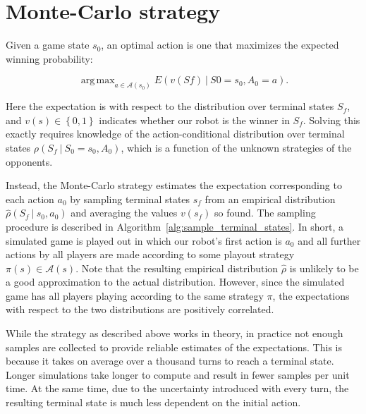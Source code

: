 \documentclass{article}
\newcommand{\Action}{A}
\newcommand{\action}{a}
\newcommand{\actions}{\mathcal{A}}
\newcommand{\randomState}{S}
\newcommand{\state}{s}
\newcommand{\evaluator}{v}
\newcommand{\probability}{\rho}
\newcommand{\expectation}[2]{E\left({#1\given#2}\right)}
\newcommand{\given}[1][]{\:#1\vert\:}
\DeclareMathOperator*{\argmax}{arg\,max}
\newcommand{\initial}{0}
\newcommand{\final}{f}
\begin{document}
\section{Monte-Carlo strategy}

Given a game state $\state_\initial$, an optimal action is one that maximizes the expected winning probability:

\[
\argmax_{\action \in \actions\left(\state_\initial\right)} \expectation{\evaluator\left(\randomState\final\right)}{\randomState\initial=\state_\initial, \Action_\initial=\action}.
\]

Here the expectation is with respect to the distribution over terminal states $\randomState_\final$, and $\evaluator\left(\state\right) \in \left\{0,1\right\}$ indicates whether our robot is the winner in $\randomState_\final$.  Solving this exactly requires knowledge of the action-conditional distribution over terminal states $\probability\left(\randomState_\final \given \randomState_\initial=\state_\initial, \Action_\initial\right)$, which is a function of the unknown strategies of the opponents.

Instead, the Monte-Carlo strategy estimates the expectation corresponding to each action $\action_\initial$ by sampling terminal states $\state_\final$ from an empirical distribution $\hat{\probability}\left(\randomState_\final \given \state_\initial,\action_\initial\right)$ and averaging the values $\evaluator\left(\state_\final\right)$ so found.  The sampling procedure is described in Algorithm~\ref{alg:sample_terminal_states}.  In short, a simulated game is played out in which our robot's first action is $\action_\initial$ and all further actions by all players are made according to some playout strategy $\pi\left(\state\right) \in \actions\left(\state\right)$.  Note that the resulting empirical distribution $\hat{\probability}$ is unlikely to be a good approximation to the actual distribution.  However, since the simulated game has all players playing according to the same strategy $\pi$, the expectations with respect to the two distributions are positively correlated.

While the strategy as described above works in theory, in practice not enough samples are collected to provide reliable estimates of the expectations.  This is because it takes on average over a thousand turns to reach a terminal state.  Longer simulations take longer to compute and result in fewer samples per unit time.  At the same time, due to the uncertainty introduced with every turn, the resulting terminal state is much less dependent on the initial action.
\end{document}
